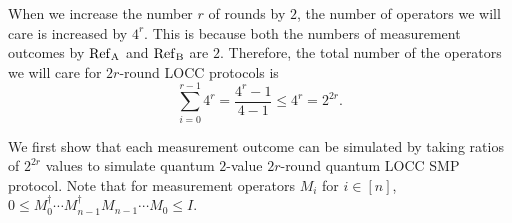 When we increase the number $r$ of rounds by $2$, the number of operators we will care is increased by $4^r$. This is because both the numbers of measurement outcomes by $\rm{Ref}_A$ and $\rm{Ref}_B$ are $2$. Therefore, the total number of the operators we will care for $2r$-round LOCC protocols is 
\begin{equation}\label{eq:num}
    \sum_{i=0}^{r-1} 4^r = \frac{4^r - 1}{4-1} \leq 4^r = 2^{2r}. 
\end{equation}

We first show that each measurement outcome can be simulated by taking ratios of $2^{2r}$ values to simulate quantum $2$-value $2r$-round quantum LOCC SMP protocol. Note that for measurement operators $M_i$ for $i\in[n]$, $0 \leq M_0^\dagger\cdots M_{n-1}^\dagger M_{n-1}\cdots M_0 \leq I$.

